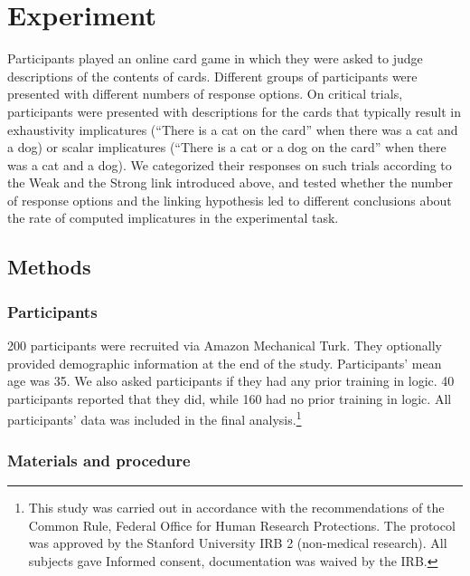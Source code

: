 \documentclass[man]{apa6}
\theoremstyle{definition}
\theoremstyle{definition}
\theoremstyle{definition}
\theoremstyle{remark}
\begin{document}
\section{Experiment}\label{experiment}

Participants played an online card game in which they were asked to
judge descriptions of the contents of cards. Different groups of
participants were presented with different numbers of response options.
On critical trials, participants were presented with descriptions for
the cards that typically result in exhaustivity implicatures
(\enquote{There is a cat on the card} when there was a cat and a dog) or
scalar implicatures (\enquote{There is a cat or a dog on the card} when
there was a cat and a dog). We categorized their responses on such
trials according to the Weak and the Strong link introduced above, and
tested whether the number of response options and the linking
hypothesis led to different conclusions about the rate of computed
implicatures in the experimental task.

\subsection{Methods}\label{methods}

\subsubsection{Participants}\label{participants}

200 participants were recruited via Amazon Mechanical Turk. They
optionally provided demographic information at the end of the study.
Participants' mean age was 35. We also asked participants if they had
any prior training in logic. 40 participants reported that they did,
while 160 had no prior training in logic. All participants' data was
included in the final analysis.\footnote{This study was carried out in accordance with the recommendations of the Common Rule, Federal Office for Human Research Protections. The protocol was approved by the Stanford University IRB 2 (non-medical research). All subjects gave Informed consent, documentation was waived by the IRB.}

\subsubsection{Materials and procedure}\label{materials-and-procedure}
\end{document}
